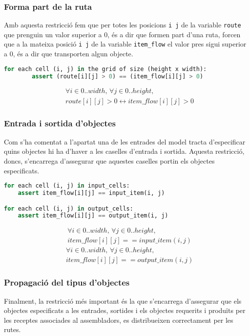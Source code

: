 \subsubsection{Forma part de la ruta} \label{subsubsec:part_of_route_object_type}
Amb aquesta restricció fem que per totes les posicions \texttt{i j} de la variable \texttt{route} que prenguin un valor superior a 0, és a dir que formen part d'una ruta, forcen que a la mateixa posició \texttt{i j} de la variable \texttt{item\_flow} el valor pres sigui superior a 0, és a dir que transporten algun objecte.
\begin{lstlisting}[language=Python, caption=Part of Route]
for each cell (i, j) in the grid of size (height x width):
        assert (route[i][j] > 0) == (item_flow[i][j] > 0)
\end{lstlisting}
\begin{align*}
    &\forall i \in 0..width, \, \forall j \in 0..height, \\
    & route[i][j]>0 \leftrightarrow item\_flow[i][j]>0
\end{align*}


\subsubsection{Entrada i sortida d'objectes}
Com s'ha comentat a l'apartat  una de les entrades del model tracta d'especificar quins objectes hi ha d'haver a les caselles d'entrada i sortida. Aquesta restricció, doncs, s'encarrega d'assegurar que aquestes caselles portin els objectes especificats.
\begin{lstlisting}[language=Python, caption=Item Input i Output]
for each cell (i, j) in input_cells:
    assert item_flow[i][j] == input_item(i, j)

for each cell (i, j) in output_cells:
    assert item_flow[i][j] == output_item(i, j)
\end{lstlisting}
\begin{align*}
    &\forall i \in 0..width, \, \forall j \in 0..height, \\
    & item\_flow[i][j] == input\_item(i, j)
\end{align*}
\begin{align*}
    &\forall i \in 0..width, \, \forall j \in 0..height, \\
    & item\_flow[i][j] == output\_item(i, j)
\end{align*}



\subsubsection{Propagació del tipus d'objectes}
Finalment, la restricció més important és la que s'encarrega d'assegurar que els objectes especificats a les entrades, sortides i els objectes requerits i produïts per les receptes associades al assembladors, es distribueixen correctament per les rutes.\\

